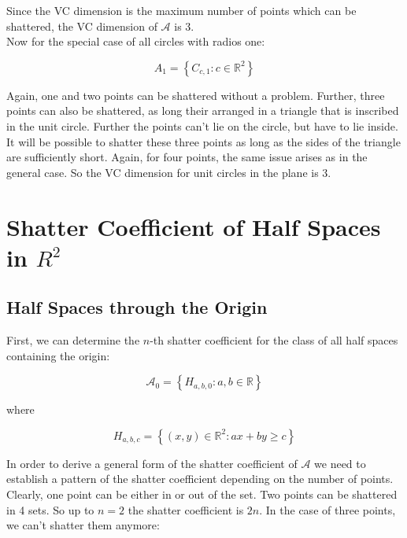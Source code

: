 \documentclass[a4paper, 11pt]{article} %
\begin{document}
Since the VC dimension is the maximum number of points which can be shattered, the VC dimension of $\mathcal{A}$ is 3.\\

Now for the special case of all circles with radios one:

$$A _ { 1 } = \left\{ C _ { c , 1 } : c \in \mathbb { R } ^ { 2 } \right\}$$

Again, one and two points can be shattered without a problem. Further, three points can also be shattered, as long their arranged in a triangle that is inscribed in the unit circle. Further the points can't lie on the circle, but have to lie inside. It will be possible to shatter these three points as long as the sides of the triangle are sufficiently short. Again, for four points, the same issue arises as in the general case. So the VC dimension for unit circles in the plane is 3.

\section*{Shatter Coefficient of Half Spaces in $R^2$}

\subsection*{Half Spaces through the Origin}

First, we can determine the $n$-th shatter coefficient for the class of all half spaces containing the origin:

$$\mathcal { A } _ { 0 } = \left\{ H _ { a , b , 0 } : a , b \in \mathbb { R } \right\}$$ 

where 

$$H _ { a , b , c } = \left\{ ( x , y ) \in \mathbb { R } ^ { 2 } : a x + b y \geq c \right\}$$

In order to derive a general form of the shatter coefficient of $\mathcal{A}$ we need to establish a pattern of the shatter coefficient depending on the number of points. Clearly, one point can be either in or out of the set. Two points can be shattered in 4 sets. So up to $n=2$ the shatter coefficient is $2n$. In the case of three points, we can't shatter them anymore: \\

\end{document}
